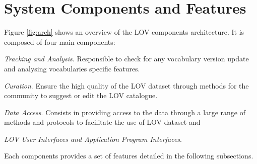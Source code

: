 \documentclass{iosart2c}
\begin{document}
\section{System Components and Features}
	Figure \ref{fig:arch} shows an overview of the LOV components architecture. It is composed of four main components: 
\begin{inparaenum}[1)] 
	\item \emph{Tracking and Analysis}. Responsible to check for any vocabulary version update and analysing vocabularies specific features.
	\item \emph{Curation}. Ensure the high quality of the LOV dataset through methods for the community to suggest or edit the LOV catalogue.
	\item \emph{Data Access}. Consists in providing access to the data through a large range of methods and protocols to facilitate the use of LOV dataset and
	\item \emph{LOV User Interfaces and Application Program Interfaces}.
\end{inparaenum} 
Each components provides a set of features detailed in the following subsections.

\end{document}
